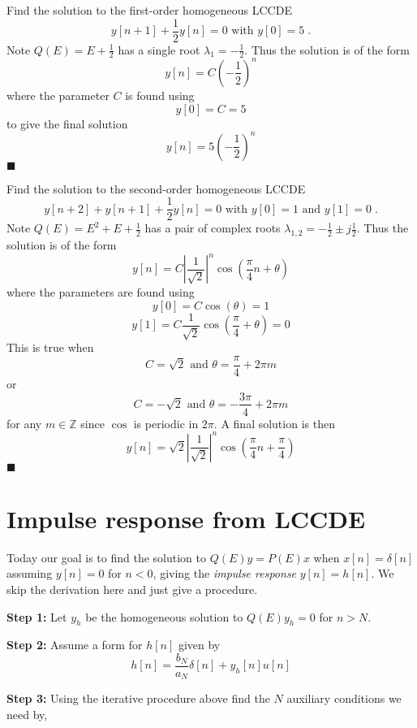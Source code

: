 \begin{example}
  Find the solution to the first-order homogeneous LCCDE
  \[
  y[n+1] + \frac{1}{2}y[n] = 0 \mbox{ with } y[0] = 5 \; .
  \]
  Note $Q(E) = E + \frac{1}{2}$ has a single root $\lambda_1 = -\frac{1}{2}$. Thus the solution is of the form
  \[
  y[n] = C\left( -\frac{1}{2}\right)^n
  \]
  where the parameter $C$ is found using
  \[
  y[0] = C = 5
  \]
  to give the final solution
  \[
  y[n] = 5\left( -\frac{1}{2}\right)^n
  \]
  $\blacksquare$  
\end{example}

\begin{example}
  Find the solution to the second-order homogeneous LCCDE
  \[
  y[n+2] + y[n+1] + \frac{1}{2}y[n] = 0 \mbox{ with } y[0] = 1 \mbox{ and } y[1] = 0\; .
  \]
  Note $Q(E) = E^2 + E + \frac{1}{2}$ has a pair of complex roots $\lambda_{1,2} = -\frac{1}{2} \pm j\frac{1}{2}$. Thus the solution is of the form
  \[
  y[n] = C \left|\frac{1}{\sqrt{2}}\right|^n\cos\left(\frac{\pi}{4} n + \theta\right)
  \]
  where the parameters are found using
  \[
  y[0] = C\cos\left(\theta\right) = 1
  \]
  \[
  y[1] = C\frac{1}{\sqrt{2}}\cos\left(\frac{\pi}{4} + \theta\right) = 0
  \]
  This is true when
  \[
  C = \sqrt{2} \mbox{ and } \theta = \frac{\pi}{4} + 2\pi m
  \]
  or
  \[      
  C = -\sqrt{2} \mbox{ and } \theta = -\frac{3\pi}{4} + 2\pi m
  \]
  for any $m\in \mathbb{Z}$ since $\cos$ is periodic in $2\pi$. A final solution is then
  \[
  y[n] = \sqrt{2} \left|\frac{1}{\sqrt{2}}\right|^n\cos\left(\frac{\pi}{4} n + \frac{\pi}{4}\right)
  \]
  $\blacksquare$
\end{example}

\section{Impulse response from LCCDE}

Today our goal is to find the solution to $Q(E)y=P(E)x$ when $x[n] = \delta[n]$ assuming $y[n] = 0$ for $n < 0$, giving the \emph{impulse response} $y[n] = h[n]$. We skip the derivation here and just give a procedure.

\textbf{Step 1:} Let $y_h$ be the homogeneous solution to $Q(E)y_h=0$ for $n > N$.

\textbf{Step 2:} Assume a form for $h[n]$ given by
\[
h[n] = \frac{b_N}{a_N}\delta[n] + y_h[n]u[n]
\]

\textbf{Step 3:} Using the iterative procedure above find the $N$ auxiliary conditions we need by,

